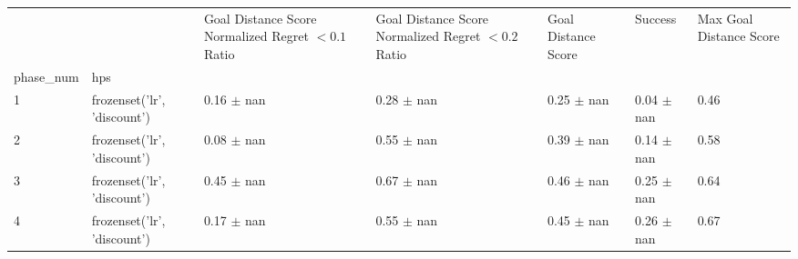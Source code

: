 \begin{tabular}{lllllll}
\toprule
 &  & Goal Distance Score Normalized Regret $< 0.1$ Ratio & Goal Distance Score Normalized Regret $< 0.2$ Ratio & Goal Distance Score & Success & Max Goal Distance Score \\
phase_num & hps &  &  &  &  &  \\
\midrule
1 & frozenset({'lr', 'discount'}) & 0.16 $\pm$ nan & 0.28 $\pm$ nan & 0.25 $\pm$ nan & 0.04 $\pm$ nan & 0.46 \\
\cline{1-7}
2 & frozenset({'lr', 'discount'}) & 0.08 $\pm$ nan & 0.55 $\pm$ nan & 0.39 $\pm$ nan & 0.14 $\pm$ nan & 0.58 \\
\cline{1-7}
3 & frozenset({'lr', 'discount'}) & 0.45 $\pm$ nan & 0.67 $\pm$ nan & 0.46 $\pm$ nan & 0.25 $\pm$ nan & 0.64 \\
\cline{1-7}
4 & frozenset({'lr', 'discount'}) & 0.17 $\pm$ nan & 0.55 $\pm$ nan & 0.45 $\pm$ nan & 0.26 $\pm$ nan & 0.67 \\
\cline{1-7}
\bottomrule
\end{tabular}
